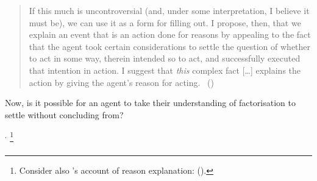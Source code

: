 \begin{note}
{\begin{quote}
      If this much is uncontroversial (and, under some interpretation, I believe it must be), we can use it as a form for filling out.
      I propose, then, that we explain an event that is an action done for reasons by appealing to the fact that the agent took certain considerations to settle the question of whether to act in some way, therein intended so to act, and successfully executed that intention in action.
      I suggest that \emph{this} complex fact [\dots] explains the action by giving the agent's reason for acting.%
      \mbox{ }\hfill\mbox{(\citeyear[421]{Hieronymi:2011aa})}
    \end{quote}
    Now, is it possible for an agent to take their understanding of factorisation to settle without concluding from?
  }%
  \(^{,}\)%
  \footnote{
    Consider also \citeauthor{Harman:1973ww}'s account of reason explanation:
     (\citeyear[52]{Harman:1973ww}).
  }
\end{note}

\paragraph*{}



